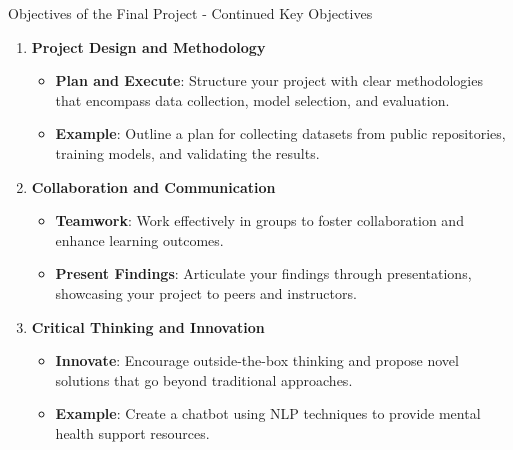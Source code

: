 \documentclass[aspectratio=169]{beamer}
\begin{document}
\begin{frame}[fragile]{Objectives of the Final Project - Continued Key Objectives}
    \begin{enumerate}[start=4]
        \item \textbf{Project Design and Methodology}
        \begin{itemize}
            \item \textbf{Plan and Execute}: Structure your project with clear methodologies that encompass data collection, model selection, and evaluation.
            \item \textbf{Example}: Outline a plan for collecting datasets from public repositories, training models, and validating the results.
        \end{itemize}

        \item \textbf{Collaboration and Communication}
        \begin{itemize}
            \item \textbf{Teamwork}: Work effectively in groups to foster collaboration and enhance learning outcomes.
            \item \textbf{Present Findings}: Articulate your findings through presentations, showcasing your project to peers and instructors.
        \end{itemize}

        \item \textbf{Critical Thinking and Innovation}
        \begin{itemize}
            \item \textbf{Innovate}: Encourage outside-the-box thinking and propose novel solutions that go beyond traditional approaches.
            \item \textbf{Example}: Create a chatbot using NLP techniques to provide mental health support resources.
        \end{itemize}
    \end{enumerate}
\end{frame}
\end{document}
